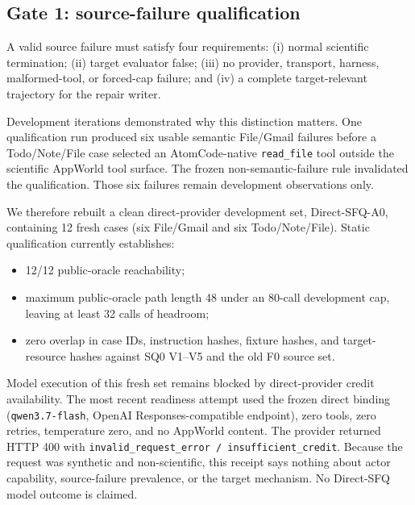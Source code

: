 \documentclass{article}
\begin{document}
\subsection{Gate 1: source-failure qualification}
A valid source failure must satisfy four requirements: (i) normal scientific termination; (ii) target evaluator false; (iii) no provider, transport, harness, malformed-tool, or forced-cap failure; and (iv) a complete target-relevant trajectory for the repair writer.

Development iterations demonstrated why this distinction matters. One qualification run produced six usable semantic File/Gmail failures before a Todo/Note/File case selected an AtomCode-native \texttt{read\_file} tool outside the scientific AppWorld tool surface. The frozen non-semantic-failure rule invalidated the qualification. Those six failures remain development observations only.

We therefore rebuilt a clean direct-provider development set, Direct-SFQ-A0, containing 12 fresh cases (six File/Gmail and six Todo/Note/File). Static qualification currently establishes:
\begin{itemize}
 \item 12/12 public-oracle reachability;
 \item maximum public-oracle path length 48 under an 80-call development cap, leaving at least 32 calls of headroom;
 \item zero overlap in case IDs, instruction hashes, fixture hashes, and target-resource hashes against SQ0 V1--V5 and the old F0 source set.
\end{itemize}
Model execution of this fresh set remains blocked by direct-provider credit availability. The most recent readiness attempt used the frozen direct binding (\texttt{qwen3.7-flash}, OpenAI Responses-compatible endpoint), zero tools, zero retries, temperature zero, and no AppWorld content. The provider returned HTTP 400 with \texttt{invalid\_request\_error / insufficient\_credit}. Because the request was synthetic and non-scientific, this receipt says nothing about actor capability, source-failure prevalence, or the target mechanism. No Direct-SFQ model outcome is claimed.
\end{document}
